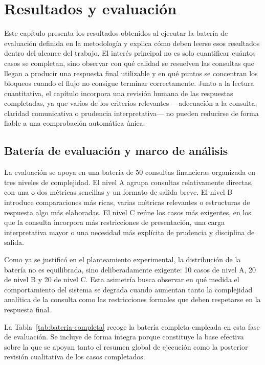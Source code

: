 \chapter{Resultados y evaluaci\'on}

Este cap\'itulo presenta los resultados obtenidos al ejecutar la bater\'ia de evaluaci\'on definida en la metodolog\'ia y 
explica c\'omo deben leerse esos resultados dentro del alcance del trabajo. El inter\'es principal no es solo cuantificar 
cu\'antos casos se completan, sino observar con qu\'e calidad se resuelven las consultas que llegan a producir una respuesta 
final utilizable y en qu\'e puntos se concentran los bloqueos cuando el flujo no consigue terminar correctamente. Junto a 
la lectura cuantitativa, el cap\'itulo incorpora una revisi\'on humana de las respuestas completadas, ya que varios de los 
criterios relevantes ---adecuaci\'on a la consulta, claridad comunicativa o prudencia interpretativa--- no pueden reducirse 
de forma fiable a una comprobaci\'on autom\'atica \'unica.

\section{Bater\'ia de evaluaci\'on y marco de an\'alisis}

La evaluaci\'on se apoya en una bater\'ia de 50 consultas financieras organizada en tres niveles de complejidad. El nivel A 
agrupa consultas relativamente directas, con una o dos m\'etricas sencillas y un formato de salida breve. El nivel B 
introduce comparaciones m\'as ricas, varias m\'etricas relevantes o estructuras de respuesta algo m\'as elaboradas. El nivel 
C re\'une los casos m\'as exigentes, en los que la consulta incorpora m\'as restricciones de presentaci\'on, una carga 
interpretativa mayor o una necesidad m\'as expl\'icita de prudencia y disciplina de salida.

Como ya se justific\'o en el planteamiento experimental, la distribuci\'on de la bater\'ia no es equilibrada, sino 
deliberadamente exigente: 10 casos de nivel A, 20 de nivel B y 20 de nivel C. Esta asimetr\'ia busca observar en qu\'e 
medida el comportamiento del sistema se degrada cuando aumentan tanto la complejidad anal\'itica de la consulta como las 
restricciones formales que deben respetarse en la respuesta final.

La Tabla~\ref{tab:bateria-completa} recoge la bater\'ia completa empleada en esta fase de evaluaci\'on. Se incluye de forma 
\'integra porque constituye la base efectiva sobre la que se apoyan tanto el resumen global de ejecuci\'on como la posterior 
revisi\'on cualitativa de los casos completados.

